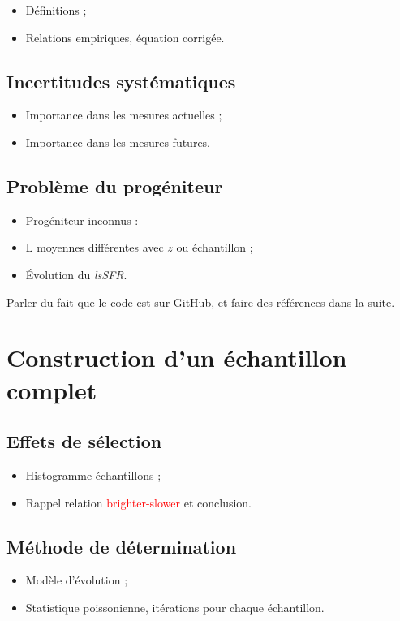 \documentclass[a4paper, 12pt, svgnames]{article}
\begin{document}
\begin{itemize}
    \item Définitions ;
    \item Relations empiriques, équation corrigée.
\end{itemize}

\subsection{Incertitudes systématiques}
\begin{itemize}
    \item Importance dans les mesures actuelles ;
    \item Importance dans les mesures futures.
\end{itemize}

\subsection{Problème du progéniteur}
\begin{itemize}
    \item Progéniteur inconnus :
    \item L moyennes différentes avec $z$ ou échantillon ;
    \item Évolution du \textit{lsSFR}.
\end{itemize}

Parler du fait que le code est sur GitHub, et faire des références dans la
suite.

\section{Construction d'un échantillon complet}
\subsection{Effets de sélection}
\begin{itemize}
    \item Histogramme échantillons ;
    \item Rappel relation \textcolor{red}{brighter-slower} et conclusion.
\end{itemize}

\subsection{Méthode de détermination}
\begin{itemize}
    \item Modèle d'évolution ;
    \item Statistique poissonienne, itérations pour chaque échantillon.
\end{itemize}
\end{document}
